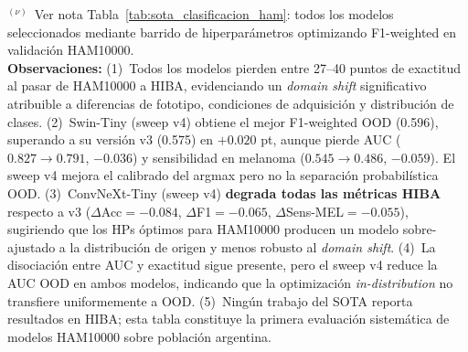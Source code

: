 \begin{table}[htbp]
{\begin{tabular}{@{}llcrrrrr@{}}
\bottomrule
\end{tabular}%
}
\vspace{4pt}
\begin{minipage}{\textwidth}
  \footnotesize
  $^{(\nu)}$~Ver nota Tabla~\ref{tab:sota_clasificacion_ham}: todos los modelos seleccionados
  mediante barrido de hiperparámetros optimizando F1-weighted en validación HAM10000.\\[4pt]
  \textbf{Observaciones:}
  (1)~Todos los modelos pierden entre 27--40 puntos de exactitud al pasar de HAM10000 a HIBA,
  evidenciando un \textit{domain shift} significativo atribuible a diferencias de fototipo,
  condiciones de adquisición y distribución de clases.
  (2)~Swin-Tiny (sweep v4) obtiene el mejor F1-weighted OOD (0.596), superando a su versión v3
  (0.575) en $+0.020$ pt, aunque pierde AUC ($0.827{\rightarrow}0.791$, $-0.036$) y sensibilidad
  en melanoma ($0.545{\rightarrow}0.486$, $-0.059$). El sweep v4 mejora el calibrado del argmax
  pero no la separación probabilística OOD.
  (3)~ConvNeXt-Tiny (sweep v4) \textbf{degrada todas las métricas HIBA} respecto a v3
  ($\Delta$Acc${=}{-}0.084$, $\Delta$F1${=}{-}0.065$, $\Delta$Sens-MEL${=}{-}0.055$),
  sugiriendo que los HPs óptimos para HAM10000 producen un modelo sobre-ajustado a la
  distribución de origen y menos robusto al \textit{domain shift}.
  (4)~La disociación entre AUC y exactitud sigue presente, pero el sweep v4 reduce la AUC OOD
  en ambos modelos, indicando que la optimización \textit{in-distribution} no transfiere
  uniformemente a OOD.
  (5)~Ningún trabajo del SOTA reporta resultados en HIBA; esta tabla constituye
  la primera evaluación sistemática de modelos HAM10000 sobre población argentina.
\end{minipage}
\end{table}


